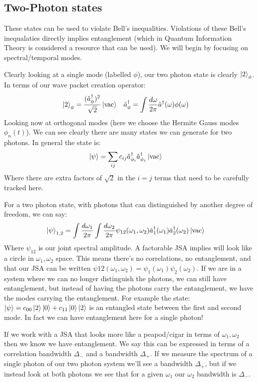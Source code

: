 \subsection{Two-Photon states}
These states can be used to violate Bell's inequalities. Violations of these Bell's inequalaties directly implies entanglement (which in Quantum Information Theory is considered a resource that can be used).
We will begin by focusing on spectral/temporal modes.

Clearly looking at a single mode (labelled $\phi$), our two photon state is clearly $\ket{2}_\phi$. In terms of our wave packet creation operator:
\begin{align*}
	\ket{2}_\phi &= \frac{(\hat{a}^\dagger_\phi)^2}{\sqrt{2}} \ket{\text{vac}} & \hat{a}_\phi^\dagger &= \int \frac{d\omega}{2\pi} \hat{a}^\dagger(\omega)\phi(\omega)
\end{align*}
Looking now at orthogonal modes (here we choose the Hermite Gauss modes $\phi_n(t)$). We can see clearly there are many states we can generate for two photons. In general the state is:
\begin{align*}
	\ket{\psi} &= \sum_{ij} c_{ij} \hat{a}^\dagger_{\phi_i} \hat{a}^\dagger_{\phi_j} \ket{\text{vac}}
\end{align*}
Where there are extra factors of $\sqrt{2}$ in the $i=j$ terms that need to be carefully tracked here.

For a two photon state, with photons that can distinguished by another degree of freedom, we can say:
\begin{align*}
	\ket{\psi}_{1,2} &= \int \frac{d\omega_1}{2\pi}\int \frac{d\omega_2}{2\pi} \psi_{12}(\omega_1,\omega_2) \hat{a}^\dagger_1(\omega_1) \hat{a}_2^\dagger(\omega_2)\ket{\text{vac}}
\end{align*}
Where $\psi_{12}$ is our joint spectral amplitude. A factorable JSA implies will look like a circle in $\omega_1, \omega_2$ space. 
This means there's no correlations, no entanglement, and that our JSA can be written $\psi{12}(\omega_1,\omega_2) = \psi_1(\omega_1)\psi_2(\omega_2)$.
If we are in a system where we can no longer distinguish the photons, we can still have entanglement, but instead of having the photons carry the entanglement, we have the modes carrying the entanglement.
For example the state: $\ket{\psi} = c_{00} \ket{2}\ket{0} + c_{11}\ket{0}\ket{2}$ is an entangled state between the first and second mode. In fact we can have entanglement here for a single photon!

If we work with a JSA that looks more like a peapod/cigar in terms of $\omega_1,\omega_2$ then we know we have entanglement. We say this can be expressed in terms of a correlation bandwidth $\Delta_-$ and a bandwidth $\Delta_+$.
If we measure the spectrum of a single photon of our two photon system we'll see a bandwidth $\Delta_+$, but if we instead look at both photons we see that for a given $\omega_1$ our $\omega_2$ bandwidth is $\Delta_-$.

